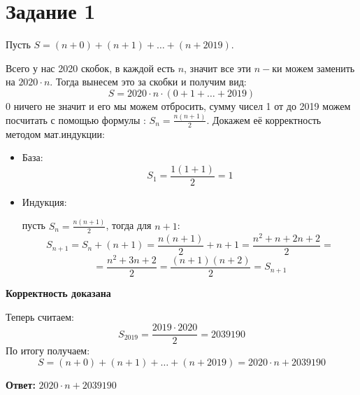 \documentclass[a4paper,12pt]{article}
\author{Бурмашев Григорий, БПМИ-208}
\title{}
\date{\today}
\begin{document}
\section*{Задание 1}
Пусть $S = (n + 0) + (n + 1) + \ldots + (n + 2019)$.

Всего у нас 2020 скобок, в каждой есть $n$, значит все эти $n-$ки можем заменить на $2020 \cdot n$. Тогда вынесем это за скобки и получим вид:
\[
S = 2020 \cdot n \cdot (0 + 1 + \ldots + 2019)
\]
0 ничего не значит и его мы можем отбросить, сумму чисел 1 от до 2019 можем посчитать с помощью формулы : $S_n = \frac{n(n+1)}{2}$. Докажем её корректность методом мат.индукции:
\begin{itemize}
\item База:
\[
S_1 = \frac{1(1 + 1)}{2} = 1
\]
\item Индукция:

пусть $S_n = \frac{n(n+1)}{2}$, тогда для $n + 1$:
\[
S_{n + 1} = S_n + (n + 1) = \frac{n(n+1)}{2} + n + 1 = \frac{n^2 + n + 2n + 2}{2} =
\]
\[
=
\frac{n^2 + 3n + 2}{2} = \frac{(n+1)(n+2)}{2} = S_{n + 1}
\]
\end{itemize}
\begin{center}
\textbf{Корректность доказана} 
\end{center}
Теперь считаем:
\[
S_{2019} = \frac{2019 \cdot 2020}{2} = 2039190
\]
По итогу получаем:
\[
S = (n + 0) + (n + 1) + \ldots + (n + 2019) = 2020 \cdot n + 2039190
\]
\begin{center}
\textbf{Ответ: } $2020 \cdot n + 2039190$
\end{center}
\end{document}
